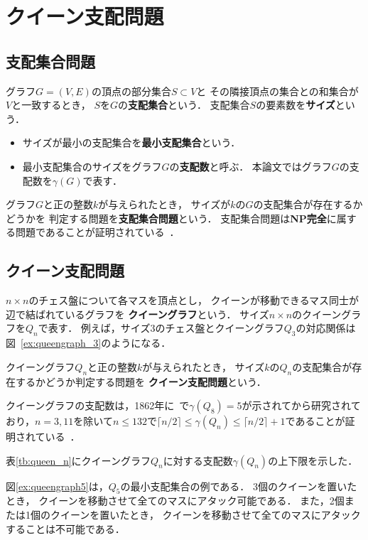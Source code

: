 \chapter{クイーン支配問題}\label{chap:background}

\section{支配集合問題}
グラフ$G=(V,E)$の頂点の部分集合$S\subset V$と
その隣接頂点の集合との和集合が$V$と一致するとき，
$S$を$G$の\textbf{支配集合}という．
支配集合$S$の要素数を\textbf{サイズ}という．
 \begin{itemize}
  \item サイズが最小の支配集合を\textbf{最小支配集合}という．
  \item 最小支配集合のサイズをグラフ$G$の\textbf{支配数}と呼ぶ．
    本論文ではグラフ$G$の支配数を$\gamma(G)$で表す．
 \end{itemize}

グラフ$G$と正の整数$k$が与えられたとき，
サイズが$k$の$G$の支配集合が存在するかどうかを
判定する問題を\textbf{支配集合問題}という．
支配集合問題は\textbf{NP完全}に属する問題であることが証明されている~\cite{Jhonson79}．

\section{クイーン支配問題}
$n\times n$のチェス盤について各マスを頂点とし，
クイーンが移動できるマス同士が辺で結ばれているグラフを
\textbf{クイーングラフ}という．
サイズ$n\times n$のクイーングラフを$Q_n$で表す．
例えば，サイズ3のチェス盤とクイーングラフ$Q_3$の対応関係は
図~\ref{ex:queengraph_3}のようになる．

クイーングラフ$Q_n$と正の整数$k$が与えられたとき，
サイズ$k$の$Q_n$の支配集合が存在するかどうか判定する問題を
\textbf{クイーン支配問題}という． \par
クイーングラフの支配数は，1862年に~\cite{Jaenisch62}で$\gamma(Q_8)=5$が示されてから研究されており，$n=3,11$を除いて$n \leq 132$で$\lceil n/2 \rceil \leq \gamma(Q_n) \leq \lceil n/2 \rceil +1 $であることが証明されている~\cite{Ostergard01}．

表\ref{tb:queen_n}にクイーングラフ$Q_n$に対する支配数$\gamma(Q_n)$の上下限を示した．



図\ref{ex:queengraph5}は，$Q_5$の最小支配集合の例である．
3個のクイーンを置いたとき，
クイーンを移動させて全てのマスにアタック可能である．
また，2個または1個のクイーンを置いたとき，
クイーンを移動させて全てのマスにアタックすることは不可能である．

